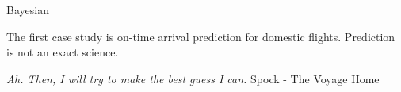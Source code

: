 \documentclass[11pt]{beamer}
\begin{document}
\begin{frame}{
	\begin{minipage}[t]{0.55\textwidth}
		Bayesian
	\end{minipage}
	\hfill
	\begin{minipage}[t]{0.35\textwidth}
		\flushright
	\end{minipage}
}{}

	The first case study is on-time arrival prediction for domestic flights. Prediction is not an exact science.
	\vspace{0.5cm}
	
	\textit{Ah. Then, I will try to make the best guess I can.} Spock - The Voyage Home

\end{frame}
\usebackgroundtemplate{}
\end{document}
